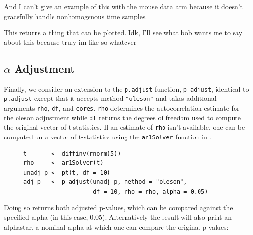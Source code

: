 \begin{center}
\end{center}

And I can't give an example of this with the mouse data atm because it doesn't gracefully handle nonhomogenous time samples.

This returns a thing that can be plotted. Idk, I'll see what bob wants me to say about this because truly im like so whatever

\subsection{$\alpha$ Adjustment}

Finally, we consider an extension to the \texttt{p.adjust} function, \texttt{p\_adjust}, identical to \texttt{p.adjust} except that it accepts method \texttt{"oleson"} and takes additional arguments \texttt{rho}, \texttt{df}, and \texttt{cores}. \texttt{rho} determines the autocorrelation estimate for the oleson adjustment while \texttt{df} returns the degrees of freedom used to compute the original vector of t-statistics. If an estimate of \texttt{rho} isn't available, one can be computed on a vector of t-statistics using the \texttt{ar1Solver} function in :



\begin{singlespace}
\begin{figure}[H]
\centering
\begin{BVerbatim}
t       <- diffinv(rnorm(5))
rho     <- ar1Solver(t)
unadj_p <- pt(t, df = 10)
adj_p   <- p_adjust(unadj_p, method = "oleson", 
                    df = 10, rho = rho, alpha = 0.05)
\end{BVerbatim}
\end{figure}
\end{singlespace}

Doing so returns both adjusted p-values, which can be compared against the specified alpha (in this case, $0.05$). Alternatively the result will also print an alphastar, a nominal alpha at which one can compare the original p-values:

